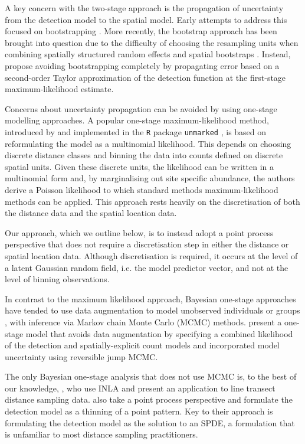 \documentclass{statsoc}
\begin{document}
A key concern with the two-stage approach is the propagation of uncertainty from the detection model to the spatial model.  Early attempts to address this focused on bootstrapping \citep{hedley_spatial_2004, lahiri_resampling_2003}.  More recently, the bootstrap approach has been brought into question due to the difficulty of choosing the resampling units when combining spatially structured random effects and spatial bootstraps \citep{bravington_VariancePropagationDensity_2021, williams_chilean_2011}. Instead, \cite{bravington_VariancePropagationDensity_2021} propose avoiding bootstrapping completely by propagating error based on a second-order Taylor approximation of the detection function at the first-stage maximum-likelihood estimate.

Concerns about uncertainty propagation can be avoided by using one-stage modelling approaches.  A popular one-stage maximum-likelihood method, introduced by \cite{royle_ModelingAbundanceEffects_2004} and implemented in the \texttt{R} package \texttt{unmarked} \citep{fiske_UnmarkedPackageFitting_2011}, is based on reformulating the model as a multinomial likelihood.  This depends on choosing discrete distance classes and binning the data into counts defined on discrete spatial units.  Given these discrete units, the likelihood can be written in a multinomial form and, by marginalising out site specific abundance, the authors derive a Poisson likelihood to which standard methods maximum-likelihood methods can be applied. This approach rests heavily on the discretisation of both the distance data and the spatial location data. 

Our approach, which we outline below, is to instead adopt a point process perspective that does not require a discretisation step in either the distance or spatial location data. Although discretisation is required, it occurs at the level of a latent Gaussian random field, i.e. the model predictor vector, and not at the level of binning observations. 

In contrast to the maximum likelihood approach, Bayesian one-stage approaches have tended to use data augmentation to model unobserved individuals or groups \citep{schmidt_using_2012}, with inference via Markov chain Monte Carlo (MCMC) methods.  \citet{oedekoven_bayesian_2014} present a one-stage model that avoids data augmentation by specifying a combined likelihood of the detection and spatially-explicit count models and incorporated model uncertainty using reversible jump MCMC.

The only Bayesian one-stage analysis that does not use MCMC is, to the best of our knowledge, \citet{yuan_point_2017}, who use INLA \citep{rue_approximate_2009} and present an application to line transect distance sampling data.  \citet{yuan_point_2017} also take a point process perspective and formulate the detection model as a thinning of a point pattern.  Key to their approach is formulating the detection model as the solution to an SPDE, a formulation that is unfamiliar to most distance sampling practitioners.
\end{document}
